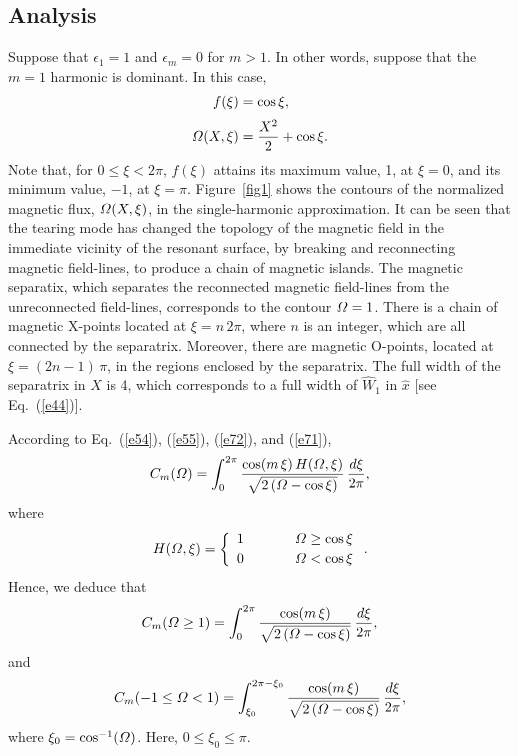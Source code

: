 \documentclass[12pt,prb,aps]{revtex4-1}
\begin{document}
\subsection{Analysis}
Suppose that $\epsilon_1=1$ and $\epsilon_m=0$ for $m>1$. In other words, suppose that the $m=1$ harmonic
is dominant. In this case,
\begin{align}
f(\xi) &= \cos\xi,\label{e71}\\[0.5ex]
{\mit\Omega}(X,\xi) &= \frac{X^2}{2}+\cos\xi.
\end{align}
Note that, for $0\leq \xi < 2\pi$, $f(\xi)$ attains its maximum value, 1, at $\xi=0$, and its minimum value, $-1$, at $\xi=\pi$. 
Figure~\ref{fig1} shows the contours of the normalized magnetic flux, ${\mit\Omega}(X,\xi)$, in the single-harmonic approximation. It can be seen that the tearing mode has changed the
topology of the magnetic field in the immediate vicinity of the resonant surface, by breaking and reconnecting magnetic field-lines,  to produce a chain of magnetic islands. The magnetic
separatix, which separates the reconnected magnetic field-lines from the unreconnected field-lines, corresponds to
the contour ${\mit\Omega}=1$. There is a chain of magnetic
X-points located at $\xi=n\,2\pi$, where $n$ is an integer, which are all connected by the separatrix. Moreover, there are magnetic O-points, located at $\xi=(2n-1)\,\pi$, in the regions enclosed by the separatrix. The full width of the separatrix in $X$ is 4, which corresponds to a full width
of $\hat{W}_1$ in $\hat{x}$ [see Eq.~(\ref{e44})]. 

According to Eq.~(\ref{e54}), (\ref{e55}), (\ref{e72}), and (\ref{e71}), 
\begin{equation}
 C_m({\mit\Omega})= \int_{0}^{2\pi}\frac{\cos(m\,\xi)\,H({\mit\Omega},\xi)}
 {\sqrt{2\left({\mit\Omega}-\cos\xi\right)}}\,\frac{d\xi}{2\pi},
 \end{equation}
 where
 \begin{equation}
 H({\mit\Omega},\xi) = \left\{
 \begin{array}{ccc} 1&~~~~~&{\mit\Omega}\geq \cos\xi\\[0.5ex]
 0 &&{\mit\Omega}< \cos\xi\end{array}\right..
 \end{equation}
 Hence, we deduce that
 \begin{equation}
 C_m({\mit\Omega}\geq 1)= \int_{0}^{2\pi}\frac{\cos(m\,\xi)}
 {\sqrt{2\left({\mit\Omega}-\cos\xi\right)}}\,\frac{d\xi}{2\pi},
\end{equation}
and 
 \begin{equation}
C_m(-1\leq {\mit\Omega}<1)= \int_{\xi_0}^{2\pi-\xi_0}\frac{\cos(m\,\xi)}
 {\sqrt{2\left({\mit\Omega}-\cos\xi\right)}}\,\frac{d\xi}{2\pi}, 
\end{equation}
 where
$\xi_0=\cos^{-1}({\mit\Omega})$. 
Here, $0\leq \xi_0\leq \pi$. 
\end{document}
